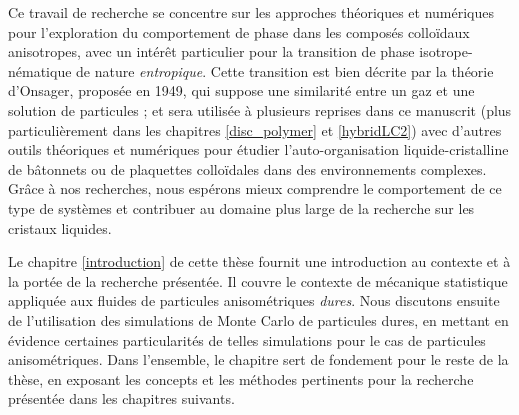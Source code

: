 Ce travail de recherche se concentre sur les approches théoriques et numériques pour l'exploration du comportement de phase dans les composés colloïdaux anisotropes, avec un intérêt particulier pour la transition de phase isotrope-nématique de nature {\em entropique}. Cette transition est bien décrite par la théorie d'Onsager, proposée en 1949, qui suppose une similarité entre un gaz et une solution de particules \cite{onsager1949} ; et sera utilisée à plusieurs reprises dans ce manuscrit (plus particulièrement dans les chapitres \ref{disc_polymer} et \ref{hybridLC2}) avec d'autres outils théoriques et numériques pour étudier l'auto-organisation liquide-cristalline de bâtonnets ou de plaquettes colloïdales dans des environnements complexes. Grâce à nos recherches, nous espérons mieux comprendre le comportement de ce type de systèmes et contribuer au domaine plus large de la recherche sur les cristaux liquides.



Le chapitre \ref{introduction} de cette thèse fournit une introduction au contexte et à la portée de la recherche présentée. Il couvre le contexte de mécanique statistique appliquée aux fluides de particules anisométriques {\em dures}. Nous discutons ensuite de l'utilisation des simulations de Monte Carlo de particules dures, en mettant en évidence certaines particularités de telles simulations pour le cas de particules anisométriques. Dans l'ensemble, le chapitre sert de fondement pour le reste de la thèse, en exposant les concepts et les méthodes pertinents pour la recherche présentée dans les chapitres suivants.


